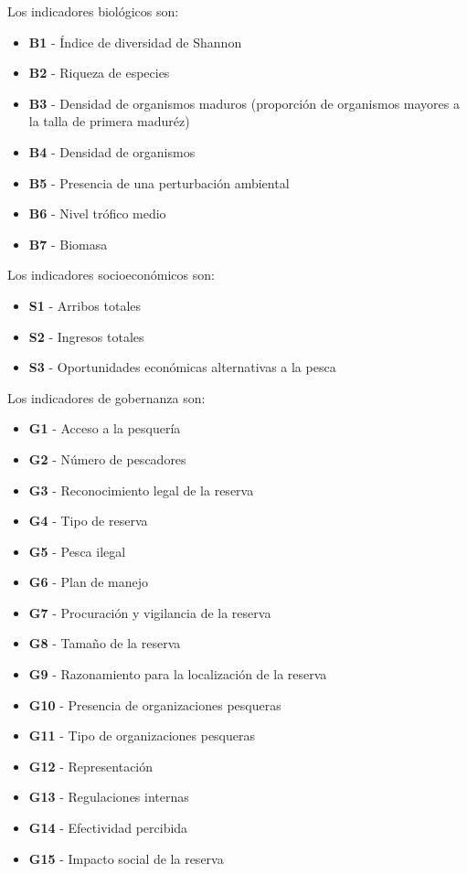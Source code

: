 \documentclass[]{krantz}
\providecommand{\tightlist}{%
  \setlength{\itemsep}{0pt}\setlength{\parskip}{0pt}}
\begin{document}
Los indicadores biológicos son:

\begin{itemize}
\tightlist
\item
  \textbf{B1} - Índice de diversidad de Shannon
\item
  \textbf{B2} - Riqueza de especies
\item
  \textbf{B3} - Densidad de organismos maduros (proporción de organismos
  mayores a la talla de primera maduréz)
\item
  \textbf{B4} - Densidad de organismos
\item
  \textbf{B5} - Presencia de una perturbación ambiental
\item
  \textbf{B6} - Nivel trófico medio
\item
  \textbf{B7} - Biomasa
\end{itemize}

Los indicadores socioeconómicos son:

\begin{itemize}
\tightlist
\item
  \textbf{S1} - Arribos totales
\item
  \textbf{S2} - Ingresos totales
\item
  \textbf{S3} - Oportunidades económicas alternativas a la pesca
\end{itemize}

Los indicadores de gobernanza son:

\begin{itemize}
\tightlist
\item
  \textbf{G1} - Acceso a la pesquería
\item
  \textbf{G2} - Número de pescadores
\item
  \textbf{G3} - Reconocimiento legal de la reserva
\item
  \textbf{G4} - Tipo de reserva
\item
  \textbf{G5} - Pesca ilegal
\item
  \textbf{G6} - Plan de manejo
\item
  \textbf{G7} - Procuración y vigilancia de la reserva
\item
  \textbf{G8} - Tamaño de la reserva
\item
  \textbf{G9} - Razonamiento para la localización de la reserva
\item
  \textbf{G10} - Presencia de organizaciones pesqueras
\item
  \textbf{G11} - Tipo de organizaciones pesqueras
\item
  \textbf{G12} - Representación
\item
  \textbf{G13} - Regulaciones internas
\item
  \textbf{G14} - Efectividad percibida
\item
  \textbf{G15} - Impacto social de la reserva
\end{itemize}
\end{document}
